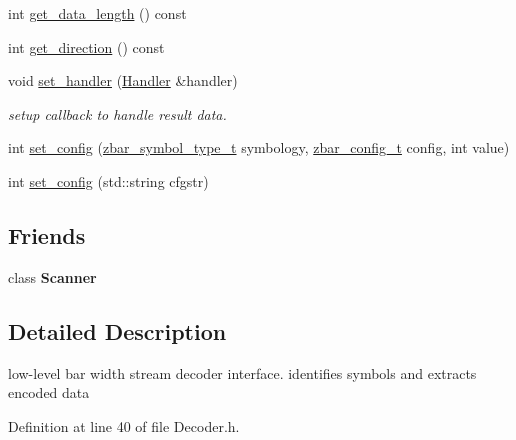 \begin{DoxyCompactItemize}
\item 
int \hyperlink{classzbar_1_1_decoder_ab2e242651335b7aa6a2b387d66c338ea}{get\_\-data\_\-length} () const 
\item 
int \hyperlink{classzbar_1_1_decoder_ab1d3d14a8b781624f3c05f7fb0374576}{get\_\-direction} () const 
\item 
\hypertarget{classzbar_1_1_decoder_ab545eab12dadb6f0fe106f0fc30e766c}{
void \hyperlink{classzbar_1_1_decoder_ab545eab12dadb6f0fe106f0fc30e766c}{set\_\-handler} (\hyperlink{classzbar_1_1_decoder_1_1_handler}{Handler} \&handler)}
\label{classzbar_1_1_decoder_ab545eab12dadb6f0fe106f0fc30e766c}

\begin{DoxyCompactList}\small\item\em setup callback to handle result data. \end{DoxyCompactList}\item 
int \hyperlink{classzbar_1_1_decoder_a3e8b45511685041de8356543a877ce17}{set\_\-config} (\hyperlink{zbar_8h_a74c1318b082084bdeaa7333b355f3e64}{zbar\_\-symbol\_\-type\_\-t} symbology, \hyperlink{zbar_8h_ae5ca63a2fe9ff3b63fc0d85995935a1d}{zbar\_\-config\_\-t} config, int value)
\item 
int \hyperlink{classzbar_1_1_decoder_abcfec892b3782c94d91008a6528d9e6e}{set\_\-config} (std::string cfgstr)
\end{DoxyCompactItemize}
\subsection*{Friends}
\begin{DoxyCompactItemize}
\item 
\hypertarget{classzbar_1_1_decoder_af4a8f36320cb35fb6b88d6b9a33cb524}{
class {\bfseries Scanner}}
\label{classzbar_1_1_decoder_af4a8f36320cb35fb6b88d6b9a33cb524}

\end{DoxyCompactItemize}


\subsection{Detailed Description}
low-\/level bar width stream decoder interface. identifies symbols and extracts encoded data 

Definition at line 40 of file Decoder.h.



